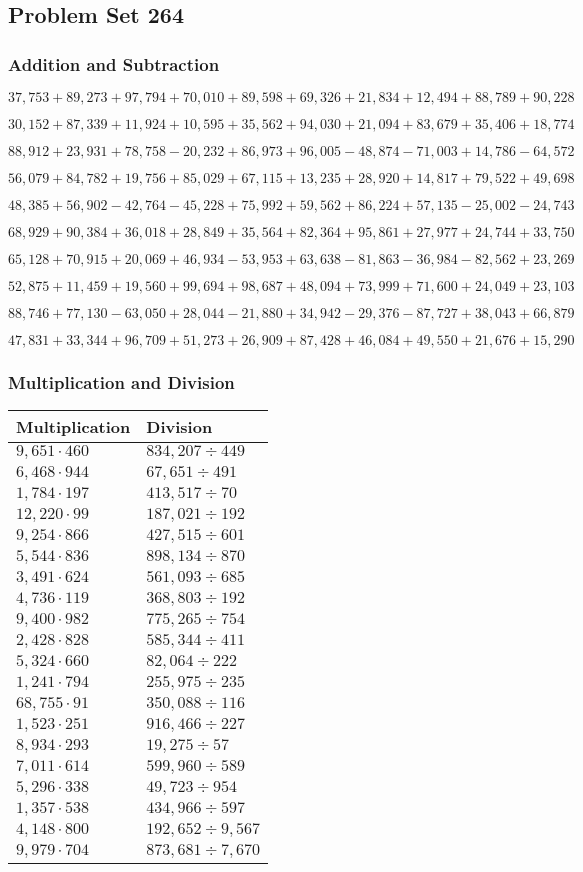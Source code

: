 \hypertarget{problem-set-264}{%
\subsection{Problem Set 264}\label{problem-set-264}}

\hypertarget{addition-and-subtraction}{%
\subsubsection{Addition and
Subtraction}\label{addition-and-subtraction}}

\(37,753+89,273+97,794+70,010+89,598+69,326+21,834+12,494+88,789+90,228\)

\(30,152+87,339+11,924+10,595+35,562+94,030+21,094+83,679+35,406+18,774\)

\(88,912+23,931+78,758-20,232+86,973+96,005-48,874-71,003+14,786-64,572\)

\(56,079+84,782+19,756+85,029+67,115+13,235+28,920+14,817+79,522+49,698\)

\(48,385+56,902-42,764-45,228+75,992+59,562+86,224+57,135-25,002-24,743\)

\(68,929+90,384+36,018+28,849+35,564+82,364+95,861+27,977+24,744+33,750\)

\(65,128+70,915+20,069+46,934-53,953+63,638-81,863-36,984-82,562+23,269\)

\(52,875+11,459+19,560+99,694+98,687+48,094+73,999+71,600+24,049+23,103\)

\(88,746+77,130-63,050+28,044-21,880+34,942-29,376-87,727+38,043+66,879\)

\(47,831+33,344+96,709+51,273+26,909+87,428+46,084+49,550+21,676+15,290\)

\hypertarget{multiplication-and-division}{%
\subsubsection{Multiplication and
Division}\label{multiplication-and-division}}

\begin{longtable}[]{@{}ll@{}}
\toprule
Multiplication & Division\tabularnewline
\midrule
\endhead
\(9,651\cdot460\) & \(834,207÷449\)\tabularnewline
\(6,468\cdot944\) & \(67,651÷491\)\tabularnewline
\(1,784\cdot197\) & \(413,517 ÷70\)\tabularnewline
\(12,220\cdot99\) & \(187,021÷192\)\tabularnewline
\(9,254\cdot866\) & \(427,515÷601\)\tabularnewline
\(5,544\cdot836\) & \(898,134÷870\)\tabularnewline
\(3,491\cdot624\) & \(561,093÷685\)\tabularnewline
\(4,736\cdot119\) & \(368,803÷192\)\tabularnewline
\(9,400\cdot982\) & \(775,265÷754\)\tabularnewline
\(2,428\cdot828\) & \(585,344÷411\)\tabularnewline
\(5,324\cdot660\) & \(82,064÷222\)\tabularnewline
\(1,241\cdot794\) & \(255,975÷235\)\tabularnewline
\(68,755\cdot91\) & \(350,088÷116\)\tabularnewline
\(1,523\cdot251\) & \(916,466÷227\)\tabularnewline
\(8,934\cdot293\) & \(19,275÷57\)\tabularnewline
\(7,011\cdot614\) & \(599,960÷589\)\tabularnewline
\(5,296\cdot338\) & \(49,723÷954\)\tabularnewline
\(1,357\cdot538\) & \(434,966÷597\)\tabularnewline
\(4,148\cdot800\) & \(192,652÷9,567\)\tabularnewline
\(9,979\cdot704\) & \(873,681÷7,670\)\tabularnewline
\bottomrule
\end{longtable}
